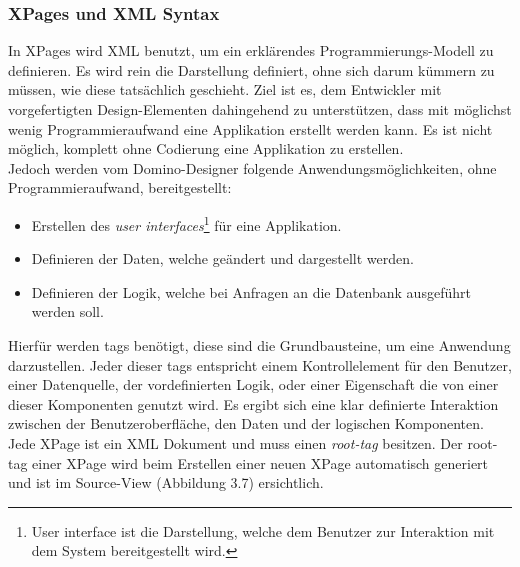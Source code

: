 \subsubsection{XPages und XML Syntax}
\label{sec:4designelemente}

In XPages wird XML benutzt, um ein erklärendes Programmierungs-Modell zu definieren. Es wird rein die Darstellung definiert, ohne sich
darum kümmern zu müssen, wie diese \linebreak tatsächlich geschieht. Ziel ist es, dem Entwickler mit vorgefertigten Design-Elementen \linebreak 
dahingehend zu unterstützen,
dass mit möglichst wenig Programmieraufwand eine \linebreak Applikation erstellt werden kann. 
Es ist nicht möglich, komplett ohne Codierung eine Applikation zu erstellen\cite{donelly}.\\
\newline
Jedoch werden vom Domino-Designer folgende Anwendungsmöglichkeiten, ohne Programmieraufwand, bereitgestellt:
\begin{itemize}
\item Erstellen des \textit{user interfaces}\footnote{User interface ist die Darstellung, welche dem Benutzer zur Interaktion mit dem System bereitgestellt wird.} 
für eine Applikation.
\item Definieren der Daten, welche geändert und dargestellt werden.
\item Definieren der Logik, welche bei Anfragen an die Datenbank ausgeführt werden soll. 
\end{itemize}

Hierfür werden tags benötigt, diese sind die Grundbausteine, um eine Anwendung \linebreak darzustellen. Jeder dieser tags entspricht einem Kontrollelement
für den Benutzer, einer \linebreak Datenquelle, der vordefinierten Logik, oder einer Eigenschaft die von einer dieser Komponenten genutzt wird.
Es ergibt sich eine klar definierte Interaktion zwischen der Benutzeroberfläche, den Daten und der logischen Komponenten.\newline
Jede XPage ist ein XML Dokument und muss einen \textit{root-tag} besitzen. 
Der root-tag einer XPage wird beim Erstellen einer neuen XPage automatisch generiert und ist im Source-View \linebreak (Abbildung 3.7) ersichtlich. \newline

